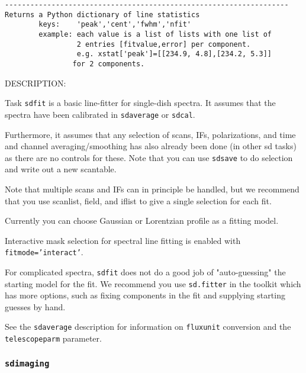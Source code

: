 \begin{verbatim}
-------------------------------------------------------------------
Returns a Python dictionary of line statistics
        keys:    'peak','cent','fwhm','nfit'
        example: each value is a list of lists with one list of
                 2 entries [fitvalue,error] per component.
                 e.g. xstat['peak']=[[234.9, 4.8],[234.2, 5.3]]
                for 2 components.
\end{verbatim}

    DESCRIPTION:

    Task {\tt sdfit} is a basic line-fitter for single-dish spectra.
    It assumes that the spectra have been calibrated in {\tt sdaverage}
    or {\tt sdcal}.

    Furthermore, it assumes that any selection of scans, IFs,
    polarizations, and time and channel averaging/smoothing has
    also already been done (in other sd tasks) as there are no controls
    for these.  Note that you can use {\tt sdsave} to do selection and write
    out a new scantable.

    Note that multiple scans and IFs can in principle be handled, but
    we recommend that you use scanlist, field, and iflist to give a
    single selection for each fit.

    Currently you can choose Gaussian or Lorentzian profile as a fitting model.
    
    Interactive mask selection for spectral line fitting is enabled with
{\tt fitmode='interact'}. 
    
    For complicated spectra, {\tt sdfit} does not do a good job of
    "auto-guessing" the starting model for the fit.  We recommend
    you use {\tt sd.fitter} in the toolkit which has more options, such
    as fixing components in the fit and supplying starting guesses
    by hand.

    See the {\tt sdaverage} description for information on {\tt fluxunit} 
    conversion and the {\tt telescopeparm} parameter.

    
\subsubsection{{\tt sdimaging}}
\label{section:sd.sdtasks.tasks.sdimaging}

